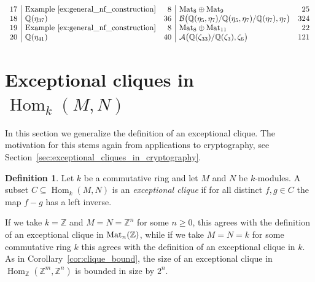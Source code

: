 \documentclass{amsart}
\theoremstyle{plain}
\theoremstyle{definition}
\newtheorem{definition}[theorem]{Definition}
\DeclareMathOperator{\Hom}{Hom}
\newcommand{\A}{\mathcal{A}}
\newcommand{\Z}{\ensuremath{\mathbb{Z}}}
\newcommand{\Q}{\ensuremath{\mathbb{Q}}}
\newcommand{\clq}{C}
\newcommand{\crg}{k}
\begin{document}
\begin{align*}
\begin{array}{r|lr|lr}
		17& \text{Example~\ref{ex:general_nf_construction}} & 8 & \textup{Mat}_8 \oplus \textup{Mat}_9 & 25 \\
		18& \Q(\eta_{37}) & 36 & \mathcal{B}\big(\Q(\eta_5,\eta_7)/\Q(\eta_5,\eta_7)/\Q(\eta_7),\eta_7\big) & 324 \\
		19& \text{Example~\ref{ex:general_nf_construction}}  & 8 &  \textup{Mat}_8 \oplus \textup{Mat}_{11}  & 22 \\
		20& \Q(\eta_{41}) & 40 & \A\big(\Q(\zeta_{33})/\Q(\zeta_3),\zeta_6\big) & 121 \\
	\end{array}
\end{align*}

\section{Exceptional cliques in $\Hom_\crg(M,N)$ }\label{sec:rankmetric}

In this section we generalize the definition of an exceptional clique. The motivation for this stems again from applications to cryptography, see Section~\ref{sec:exceptional_cliques_in_cryptography}.

\begin{definition}
	Let \(\crg\) be a commutative ring and let \(M\) and \(N\) be \(\crg\)-modules.
	A subset \(\clq\subseteq\Hom_\crg(M,N)\) is an \emph{exceptional clique} if for all distinct \(f,g\in \clq\) the map \(f-g\) has a left inverse.
\end{definition}

If we take \(\crg=\Z\) and \(M=N=\Z^n\) for some \(n\geq 0\), this agrees with the definition of an exceptional clique in \(\textup{Mat}_n(\Z)\), while if we take \(M=N=\crg\) for some commutative ring \(\crg\) this agrees with the definition of an exceptional clique in \(\crg\). 
As in Corollary~\ref{cor:clique_bound}, the size of an exceptional clique in \(\Hom_\Z(\Z^m,\Z^n)\) is bounded in size by \(2^n\).
\end{document}
